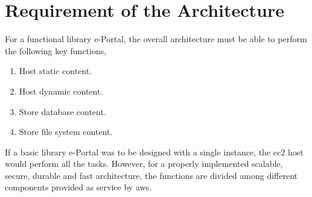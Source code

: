 \documentclass{home_assignment}
\begin{document}
    \section{Requirement of the Architecture}
    For a functional library e-Portal, the overall architecture must be able to perform the following key functions,
    \begin{enumerate}
        \item Host static content.
        \item Host dynamic content.
        \item Store database content.
        \item Store file system content.
    \end{enumerate}
    If a basic library e-Portal was to be designed with a single instance, the \acrshort{ec2} host would perform all the tasks. However, for a properly implemented scalable, secure, durable and fast architecture, the functions are divided among different components provided as service by \acrshort{aws}.
\end{document}
